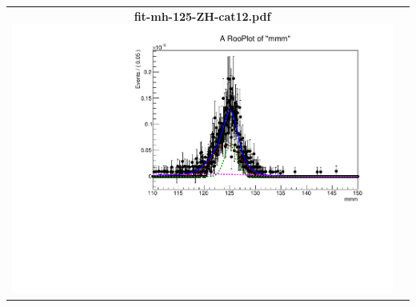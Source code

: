 \begin{longtable}{|c|c|}
{}
 \\
\hline
\parbox{0.49\textwidth}{
\centering
{\bfseries fit-mh-125-ZH-cat12.pdf}
\includegraphics[width=.49\textwidth]{figures/signal_model/AppendixBdt/ZH/125/fit_mh_125_ZH_cat12.pdf}
}
 & \\ \hline
\end{longtable}
